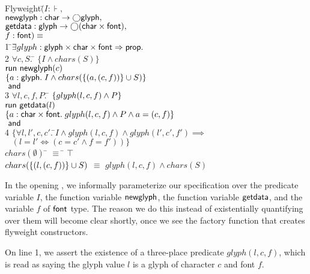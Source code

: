 \documentclass[preprint,natbib]{sigplanconf}
\begin{document}
{\small
\begin{tabbing}
Flyweight$($\=$I : \assert,\;\; $\\
\> $\mbox{\textsf{{newglyph}}} : \mbox{\textsf{{char}}} \to \bigcirc{\mbox{\textsf{{glyph}}}},$ \\
\> $\mbox{\textsf{{getdata}}} : \mbox{\textsf{{glyph}}} \to \bigcirc{(\mbox{\textsf{{char}}}\times \mbox{\textsf{{font}}})},$ \\
\> $f:\mbox{\textsf{{font}}}) \equiv$ \\
1 \qquad \=$\exists $\=$glyph : \mbox{\textsf{{glyph}}} \times \mbox{\textsf{{char}}} \times \mbox{\textsf{{font}}} \Rightarrow \mbox{\textsf{{prop}}}.$ 
\\[0.5em]

2  \> \> $\forall c, S.\;$\=
         $\{I \land chars(S)\}$ \\
   \>\>\>$\mbox{\textsf{{run }}}{\mbox{\textsf{{newglyph}}}(c)}$ \\
   \>\>\>$\{{a:\mbox{\textsf{{glyph}}}.\; 
                 I \land chars(\{{(a, (c,f))}\} \cup S)}\}$ \\
  \> \!$\mbox{\textsf{{ and }}}$ \\
3 \> $\forall l, c, f, P.\;$\=
     $\{{glyph(l, c, f) \land P}\}$ \\
\>\> $\mbox{\textsf{{run }}}{\mbox{\textsf{{getdata}}}(l)}$ \\
\>\> $\{{a:\mbox{\textsf{{char}}} \times \mbox{\textsf{{font}}}.\; glyph(l, c, f) \land P \land a = (c,f)}\}$
\\
  \> \!$\mbox{\textsf{{ and }}}$ \\
4 \> $\{\forall l, l', c, c'.\;$\=$I \land glyph(l,c,f) \land glyph(l',c',f')
 \implies $ \\
\>\>  $\;\;\;\left(l = l' \iff (c = c'\land f=f')\right)\}$ \\[0.5em]

$chars(\emptyset)$ \qquad\qquad\qquad \;\;\= $\equiv$ \= $\top$ \\
$chars(\{{(l,(c,f))}\} \cup S)$ \> $\equiv$ \> $glyph(l,c,f) \land chars(S)$ \\
\end{tabbing}
}

In the opening , we informally parameterize our specification over the
predicate variable $I$, the function variable $\mbox{\textsf{{newglyph}}}$, the
function variable $\mbox{\textsf{{getdata}}}$, and the variable $f$ of $\mbox{\textsf{{font}}}$
type. The reason we do this instead of existentially quantifying over
them will become clear shortly, once we see the factory function that
creates flyweight constructors.

On line 1, we assert the existence of a three-place predicate
$glyph(l, c, f)$, which is read as saying the glyph value $l$ is a
glyph of character $c$ and font $f$. 
\end{document}
